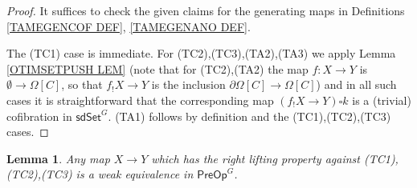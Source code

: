\documentclass[a4paper,10pt
,draft
]{article}%
\numberwithin{equation}{section}
\numberwithin{figure}{section}
\newtheorem{lemma}[equation]{Lemma}%
\theoremstyle{definition} %
\newcommand{\1}{\ensuremath{\mathbbm 1}}%
\begin{document}
\begin{proof}
	It suffices to check the given claims for the generating maps
	in Definitions \ref{TAMEGENCOF DEF}, \ref{TAMEGENANO DEF}.
	
	The (TC1) case is immediate.
	For (TC2),(TC3),(TA2),(TA3)
	we apply 
	Lemma \ref{OTIMSETPUSH LEM}
	(note that for (TC2),(TA2)
	the map $f\colon X \to Y$ is $\emptyset \to \Omega[C]$,
	so that $f_!X \to Y$ is the inclusion
	$\partial \Omega[C] \to \Omega[C]$)
	and in all such cases it is 
	straightforward that the 
	corresponding map $(f_!X \to Y) \square k$
	is a (trivial) cofibration in $\mathsf{sdSet}^G$.
	(TA1) follows by definition and the 
	(TC1),(TC2),(TC3) cases.
\end{proof}




\begin{lemma}\label{TAMETRIVFIB LEM}
	Any map $X \to Y$ which has the right lifting property against 
	(TC1),(TC2),(TC3)
	is a weak equivalence in 
	$\mathsf{PreOp}^G$.
\end{lemma}
\end{document}

